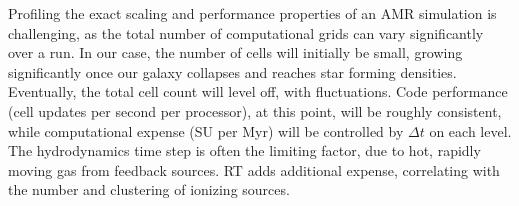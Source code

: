 \documentclass[11pt]{article}
\begin{document}

Profiling the exact scaling and performance properties of an AMR simulation is challenging, as the total number of computational grids can vary significantly over a run. In our case, the number of cells will initially be small, growing significantly once our galaxy collapses and reaches star forming densities. Eventually, the total cell count will level off, with fluctuations. Code performance (cell updates per second per processor), at this point, will be roughly consistent, while computational expense (SU per Myr) will be controlled by $\Delta t$ on each level. The hydrodynamics time step is often the limiting factor, due to hot, rapidly moving gas from feedback sources. RT adds additional expense, correlating with the number and clustering of ionizing sources.

\end{document}
